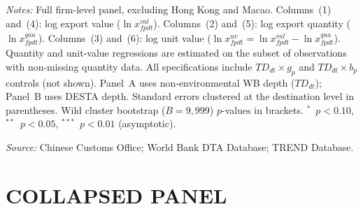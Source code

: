 \documentclass{article}
\begin{document}
\begin{table}[htbp]
\begin{threeparttable}
\begin{tablenotes}[flushleft]\footnotesize
\item \textit{Notes:} Full firm-level panel, excluding Hong Kong and Macao. Columns~(1) and~(4): log export value ($\ln x^{val}_{fpdt}$). Columns~(2) and~(5): log export quantity ($\ln x^{qua}_{fpdt}$). Columns~(3) and~(6): log unit value ($\ln x^{uv}_{fpdt} = \ln x^{val}_{fpdt} - \ln x^{qua}_{fpdt}$). Quantity and unit-value regressions are estimated on the subset of observations with non-missing quantity data. All specifications include $TD_{dt} \times g_p$ and $TD_{dt} \times b_p$ controls (not shown). Panel~A uses non-environmental WB depth ($TD_{dt}$); Panel~B uses DESTA depth. Standard errors clustered at the destination level in parentheses. Wild cluster bootstrap ($B = 9{,}999$) $p$-values in brackets. $^{*}$~$p<0.10$, $^{**}$~$p<0.05$, $^{***}$~$p<0.01$ (asymptotic).
\item \textit{Source:} Chinese Customs Office; World Bank DTA Database; TREND Database.
\end{tablenotes}
\end{threeparttable}
\end{table}

\newpage

\section{COLLAPSED PANEL}
\end{document}

